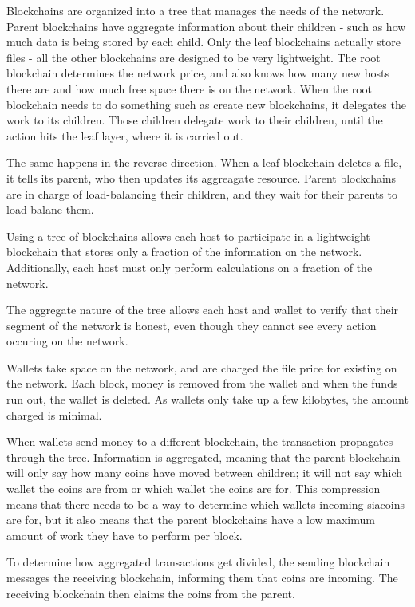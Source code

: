 \documentclass[twocolumn]{article}
\begin{document}
Blockchains are organized into a tree that manages the needs of the network.
Parent blockchains have aggregate information about their children - such as how much data is being stored by each child.
Only the leaf blockchains actually store files - all the other blockchains are designed to be very lightweight.
The root blockchain determines the network price, and also knows how many new hosts there are and how much free space there is on the network.
When the root blockchain needs to do something such as create new blockchains, it delegates the work to its children.
Those children delegate work to their children, until the action hits the leaf layer, where it is carried out.

The same happens in the reverse direction.
When a leaf blockchain deletes a file, it tells its parent, who then updates its aggreagate resource.
Parent blockchains are in charge of load-balancing their children, and they wait for their parents to load balane them.

Using a tree of blockchains allows each host to participate in a lightweight blockchain that stores only a fraction of the information on the network.
Additionally, each host must only perform calculations on a fraction of the network.

The aggregate nature of the tree allows each host and wallet to verify that their segment of the network is honest, even though they cannot see every action occuring on the network.

Wallets take space on the network, and are charged the file price for existing on the network.
Each block, money is removed from the wallet and when the funds run out, the wallet is deleted.
As wallets only take up a few kilobytes, the amount charged is minimal.

When wallets send money to a different blockchain, the transaction propagates through the tree.
Information is aggregated, meaning that the parent blockchain will only say how many coins have moved between children; it will not say which wallet the coins are from or which wallet the coins are for.
This compression means that there needs to be a way to determine which wallets incoming siacoins are for, but it also means that the parent blockchains have a low maximum amount of work they have to perform per block.

To determine how aggregated transactions get divided, the sending blockchain messages the receiving blockchain, informing them that coins are incoming.
The receiving blockchain then claims the coins from the parent.
\end{document}
